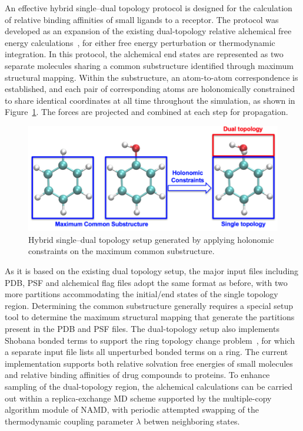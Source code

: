 An effective hybrid single--dual topology protocol is designed for the
calculation of relative binding affinities of small ligands to a receptor.
The protocol was developed as an expansion of the existing dual-topology
relative alchemical free energy calculations~\cite{JIAN2019A-CC},
for either free energy perturbation or thermodynamic integration.
In this protocol, the alchemical end states are represented as two separate
molecules sharing a common substructure identified through maximum
structural mapping.
Within the substructure, an atom-to-atom correspondence is established,
and each pair of corresponding atoms are holonomically constrained
to share identical coordinates at all time throughout the simulation,
as shown in Figure~\ref{fig:hybrid_sd_topology}.
The forces are projected and combined at each step for propagation.

\begin{figure}[tbp]
\centering
\includegraphics[width=6in]{figures/hybrid_sd_topology.png}
\caption[Hybrid single--dual topology]{%
Hybrid single--dual topology setup generated by applying
holonomic constraints on the maximum common substructure.
}
\label{fig:hybrid_sd_topology}
\end{figure}

As it is based on the existing dual topology setup, the major input files
including PDB, PSF and alchemical flag files adopt the same format as
before, with two more partitions accommodating the initial/end states of
the single topology region.
Determining the common substructure generally requires
a special setup tool to determine the maximum structural mapping
that generate the partitions present in the PDB and PSF files.
The dual-topology setup also implements Shobana bonded terms
to support the ring topology change problem~\cite{Shobana2000},
for which a separate input file
lists all unperturbed bonded terms on a ring.
The current implementation supports both relative solvation
free energies of small molecules and relative binding affinities
of drug compounds to proteins.
To enhance sampling of the dual-topology region, the alchemical
calculations can be carried out within a replica-exchange MD scheme
supported by the multiple-copy algorithm module of NAMD, with periodic
attempted swapping of the thermodynamic coupling parameter $\lambda$
betwen neighboring states.

